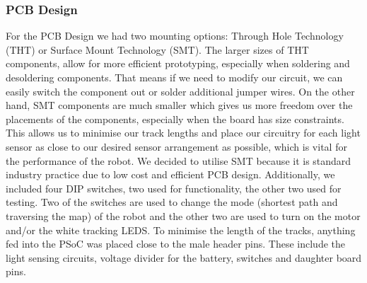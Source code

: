 \subsubsection*{PCB Design}
For the PCB Design we had two mounting options: Through Hole Technology (THT) or Surface Mount Technology (SMT). The larger sizes of THT components, allow for more efficient prototyping, especially when soldering and desoldering components. That means if we need to modify our circuit, we can easily switch the component out or solder additional jumper wires. On the other hand, SMT components are much smaller which gives us more freedom over the placements of the components, especially when the board has size constraints. 
\\This allows us to minimise our track lengths and place our circuitry for each light sensor as close to our desired sensor arrangement as possible, which is vital for the performance of the robot. We decided to utilise SMT because it is standard industry practice due to low cost and efficient PCB design. Additionally, we included four DIP switches, two used for functionality, the other two used for testing. Two of the switches are used to change the mode (shortest path and traversing the map) of the robot and the other two are used to turn on the motor and/or the white tracking LEDS. To minimise the length of the tracks, anything fed into the PSoC was placed close to the male header pins. These include the light sensing circuits, voltage divider for the battery, switches and daughter board pins.

